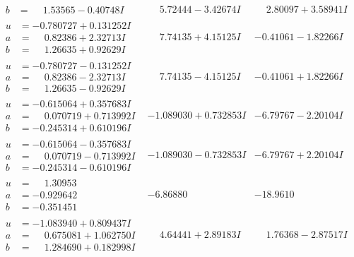 \documentclass[1p]{elsarticle_modified}
\theoremstyle{definition}
\begin{document}
$$\begin{array}{c|c|c}
\begin{aligned}
b &= \phantom{-}1.53565 - 0.40748 I\end{aligned}
 & \phantom{-}5.72444 - 3.42674 I & \phantom{-}2.80097 + 3.58941 I \\ \hline\begin{aligned}
u &= -0.780727 + 0.131252 I \\
a &= \phantom{-}0.82386 + 2.32713 I \\
b &= \phantom{-}1.26635 + 0.92629 I\end{aligned}
 & \phantom{-}7.74135 + 4.15125 I & -0.41061 - 1.82266 I \\ \hline\begin{aligned}
u &= -0.780727 - 0.131252 I \\
a &= \phantom{-}0.82386 - 2.32713 I \\
b &= \phantom{-}1.26635 - 0.92629 I\end{aligned}
 & \phantom{-}7.74135 - 4.15125 I & -0.41061 + 1.82266 I \\ \hline\begin{aligned}
u &= -0.615064 + 0.357683 I \\
a &= \phantom{-}0.070719 + 0.713992 I \\
b &= -0.245314 + 0.610196 I\end{aligned}
 & -1.089030 + 0.732853 I & -6.79767 - 2.20104 I \\ \hline\begin{aligned}
u &= -0.615064 - 0.357683 I \\
a &= \phantom{-}0.070719 - 0.713992 I \\
b &= -0.245314 - 0.610196 I\end{aligned}
 & -1.089030 - 0.732853 I & -6.79767 + 2.20104 I \\ \hline\begin{aligned}
u &= \phantom{-}1.30953\phantom{ +0.000000I} \\
a &= -0.929642\phantom{ +0.000000I} \\
b &= -0.351451\phantom{ +0.000000I}\end{aligned}
 & -6.86880\phantom{ +0.000000I} & -18.9610\phantom{ +0.000000I} \\ \hline\begin{aligned}
u &= -1.083940 + 0.809437 I \\
a &= \phantom{-}0.675081 + 1.062750 I \\
b &= \phantom{-}1.284690 + 0.182998 I\end{aligned}
 & \phantom{-}4.64441 + 2.89183 I & \phantom{-}1.76368 - 2.87517 I \\ \hline\begin{aligned}

\end{aligned}
\end{array}$$
\end{document}
